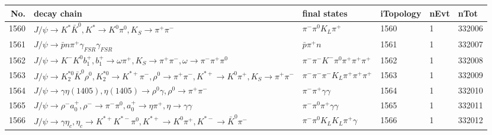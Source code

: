 \begin{table}[htbp] 
\begin{center}
\begin{small}
\begin{tabular}{rlllll}\hline\hline
 No. & decay chain & final states &  iTopology & nEvt & nTot \\\hline
1560&$J/\psi       \rightarrow K^{*}          \bar{K}^{0}   , K^{*}           \rightarrow K^{0}          \pi^{0}        , K_{S}           \rightarrow \pi^{+}        \pi^{-}        $&$\pi^{-}        \pi^{0}        K_{L}          \pi^{+}        $& 1560&    1&332006\\
1561&$J/\psi       \rightarrow \bar{p}          n                 \pi^{+}        \gamma_{FSR} \gamma_{FSR} $&$\bar{p}          \pi^{+}        n                 $& 1561&    1&332007\\
1562&$J/\psi       \rightarrow K^{-}          K^{0}          b_{1}^{+}      , b_{1}^{+}       \rightarrow \omega         \pi^{+}        , K_{S}           \rightarrow \pi^{+}        \pi^{-}        , \omega          \rightarrow \pi^{-}        \pi^{+}        \pi^{0}        $&$\pi^{-}        \pi^{-}        K^{-}          \pi^{0}        \pi^{+}        \pi^{+}        \pi^{+}        $& 1562&    1&332008\\
1563&$J/\psi       \rightarrow K_2^{*0}       \bar{K}^{0}   \rho^{0}      , K_2^{*0}        \rightarrow K^{*+}         \pi^{-}        , \rho^{0}       \rightarrow \pi^{+}        \pi^{-}        , K^{*+}          \rightarrow K^{0}          \pi^{+}        , K_{S}           \rightarrow \pi^{+}        \pi^{-}        $&$\pi^{-}        \pi^{-}        \pi^{-}        K_{L}          \pi^{+}        \pi^{+}        \pi^{+}        $& 1563&    1&332009\\
1564&$J/\psi       \rightarrow \gamma       \eta(1405)    , \eta(1405)     \rightarrow \rho^{0}      \gamma       , \rho^{0}       \rightarrow \pi^{+}        \pi^{-}        $&$\pi^{-}        \pi^{+}        \gamma       \gamma       $& 1564&    1&332010\\
1565&$J/\psi       \rightarrow \rho^{-}      a_{0}^{+}      , \rho^{-}       \rightarrow \pi^{-}        \pi^{0}        , a_{0}^{+}       \rightarrow \eta          \pi^{+}        , \eta           \rightarrow \gamma       \gamma       $&$\pi^{-}        \pi^{0}        \pi^{+}        \gamma       \gamma       $& 1565&    1&332011\\
1566&$J/\psi       \rightarrow \gamma       \eta_{c}    , \eta_{c}     \rightarrow K^{*+}         K^{*-}         \pi^{0}        , K^{*+}          \rightarrow K^{0}          \pi^{+}        , K^{*-}          \rightarrow \bar{K}^{0}   \pi^{-}        $&$\pi^{-}        \pi^{0}        K_{L}          K_{L}          \pi^{+}        \gamma       $& 1566&    1&332012\\

\end{tabular}
\end{small}
\end{center}
\end{table}
